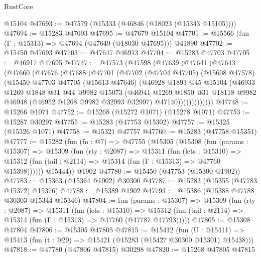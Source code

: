 \begin{lexlean}{RustCore}
\begin{coremodule}
    @15104
@47693 := @47579 (@15333 (@46846 (@18023 (@15343 @15105))))
@47694 := @15283 @47693
@47695 := @47679 @15104
@47701 := @15566 (fun (Γ : @15313) => @47694 (@47649 (@18030 @47695))) @41890
@47702 := @15450 @47693
@47703 := @47647 @46913
@47704 := @15283 @47703
@47705 := @46917 @47695
@47747 := @47573
    (@47598
      (@47639
        (@47641
          (@47643
            (@47660
              (@47676
                (@47688
                  (@47701
                    (@47702
                      (@47704 @47705)
                      (@15608 @47578)
                      (@15450
                        @47703
                        @47705
                        (@15613 @47646)
                        (@46928
                          @1893
                          @45
                          @15104
                          (@46933
                            @1269
                            @1848
                            @31
                            @44
                            @9982
                            @15073
                            (@46941
                              @1269
                              @1850
                              @31
                              @18118
                              @9982
                              @46948
                              (@46952 @1268 @9982 @32993 @32997)
                              @47140)))))))))))))
@47748 := @15266 @1071
@47752 := @15268 (@15272 @1071) (@15278 @1071)
@47753 := @15287 @30297
@47755 := @15283 (@47753 @15302)
@47757 := @15325 (@15326 @1071)
@47758 := @15321 @47757
@47760 := @15283 (@47758 @15351)
@47777 := @15282
    (fun (fn : @7) =>
    @47755
      (@15305
        (@15308
          (fun (params : @15307) =>
          @15309
            (fun (rty : @2087) =>
            @15311
              (fun (lets : @15310) =>
              @15312 (fun (tail : @2114) => @15314 (fun (Γ : @15313) => @47760 @15398))))))
        @15444))
    @1902
@47780 := @15450 (@47753 (@15300 @1902))
@47783 := @15363 (@15364 @1902) @30300
@47787 := @15283 (@15355 (@47783 @15372) @15376)
@47788 := @15389 @1902
@47793 := @15386 (@15388 @47788 @30303 @15344 @15346)
@47804 := fun (params : @15307) =>
  @15309
    (fun (rty : @2087) =>
    @15311
      (fun (lets : @15310) =>
      @15312 (fun (tail : @2114) => @15314 (fun (Γ : @15313) => @47760 (@47787 @47793)))))
@47805 := @15308 @47804
@47806 := @15305 @47805
@47815 := @15412
    (fun (U : @15411) => @15413 (fun (t : @29) => @15421 (@15283 (@15427 @30300 @15301) @15438)))
@47818 := @47780 (@47806 @47815) @30298
@47820 := @15268 @47805 @47815

\end{coremodule}
\end{lexlean}
